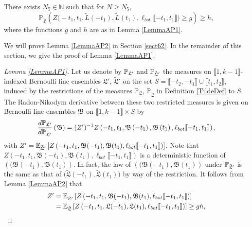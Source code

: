 \begin{lemma}\label{LemmaAP2} There exists $N_5 \in \mathbb{N}$ such that for $N \geq N_5$,
	\begin{equation}\label{eqn57}
	\mathbb{P}_{\tilde{\mathfrak{L}}} \left( Z\big(  -t_1, t_1, \tilde{L}(-t_1) , \tilde{L}(t_1), \ell_{bot}\llbracket -t_1, t_1\rrbracket\big)\geq g    \right) \geq h,
	\end{equation}
	where the functions $g$ and $h$ are as in Lemma \ref{LemmaAP1}.
\end{lemma}
We will prove Lemma \ref{LemmaAP2} in Section \ref{sect62}. In the remainder of this section, we give the proof of Lemma \ref{LemmaAP1}.
\begin{proof}[Lemma \ref{LemmaAP1}]
	
	Let us denote by $\mathbb{P}_{\mathfrak L'}$ and $\mathbb{P}_{\tilde{\mathfrak{L}}'}$ the measures on $\llbracket 1, k-1\rrbracket$-indexed Bernoulli line ensembles $\mathfrak{L}'$, $\tilde{\mathfrak{L}}'$ on the set $S = \llbracket -t_2, -t_1 \rrbracket \cup \llbracket t_1, t_2 \rrbracket$, induced by the restrictions of the measures $\mathbb{P}_{\mathfrak{L}}$, $\mathbb{P}_{\tilde{\mathfrak{L}}}$ in Definition \ref{TildeDef} to $S$. The Radon-Nikodym derivative between these two restricted measures is given on Bernoulli line ensembles $\mathfrak B$ on $\llbracket 1, k-1\rrbracket \times S$ by \begin{equation}\label{propRadon}
	\frac{d\mathbb{P}_{\mathfrak L'}}{d\mathbb{P}_{\tilde{\mathfrak L}'}}\left(\mathfrak B\right) = (Z')^{-1} Z\left(-t_1,t_1,\mathfrak{B}\left(-t_1\right),\mathfrak{B}\left(t_1\right),\ell_{bot}\llbracket -t_1,t_1\rrbracket\right),
	\end{equation}
	with $Z' = \mathbb{E}_{\tilde{\mathfrak{L}}'}\left[Z\left(-t_1, t_1, \mathfrak B(-t_1), \mathfrak B(t_1), \ell_{bot}\llbracket -t_1, t_1\rrbracket\right)\right]$. Note that $Z\left(-t_1, t_1, \mathfrak B(-t_1), \mathfrak B(t_1), \ell_{bot}\llbracket -t_1, t_1\rrbracket\right)$ is a deterministic function of $\left((\mathfrak B(-t_1), \mathfrak B(t_1)\right)$. In fact, the law of $\left((\mathfrak B(-t_1), \mathfrak B(t_1)\right)$ under $\mathbb{P}_{\tilde{\mathfrak L}'}$ is the same as that of $\big(\tilde{\mathfrak L}(-t_1), \tilde{\mathfrak L}(t_1)\big)$ by way of the restriction. It follows from Lemma \ref{LemmaAP2} that
	\begin{align*}
	Z' &= \ex_{\tilde{\mathfrak{L}}'}\left[Z\left(-t_1, t_1, \mathfrak B(-t_1), \mathfrak B(t_1), \ell_{bot}\llbracket -t_1, t_1\rrbracket\right)\right]\\
	&= \ex_{\tilde{\mathfrak{L}}}\left[Z\left(-t_1, t_1, \mathfrak L(-t_1), \mathfrak L(t_1), \ell_{bot}\llbracket -t_1, t_1\rrbracket\right)\right]\geq gh,

\end{align*}
\end{proof}
